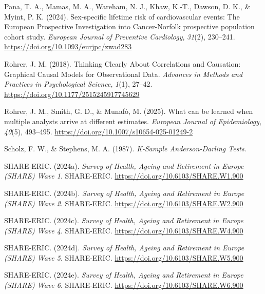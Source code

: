 \documentclass[
  man,
  floatsintext,
  longtable,
  nolmodern,
  notxfonts,
  notimes,
  colorlinks=true,linkcolor=blue,citecolor=blue,urlcolor=blue]{apa7}
\newlength{\cslhangindent}
\newenvironment{CSLReferences}[2] %
 {\begin{list}{}{%
  \setlength{\itemindent}{0pt}
  \setlength{\leftmargin}{0pt}
  \setlength{\parsep}{0pt}
  \ifodd #1
   \setlength{\leftmargin}{\cslhangindent}
   \setlength{\itemindent}{-1\cslhangindent}
  \fi
  \setlength{\itemsep}{#2\baselineskip}}}
 {\end{list}}
\begin{document}
\begin{CSLReferences}{1}{0}
Pana, T. A., Mamas, M. A., Wareham, N. J., Khaw, K.-T., Dawson, D. K.,
\& Myint, P. K. (2024). Sex-specific lifetime risk of cardiovascular
events: The {European} {Prospective} {Investigation} into
{Cancer}-{Norfolk} prospective population cohort study. \emph{European
Journal of Preventive Cardiology}, \emph{31}(2), 230--241.
\url{https://doi.org/10.1093/eurjpc/zwad283}

Rohrer, J. M. (2018). Thinking {Clearly} {About} {Correlations} and
{Causation}: {Graphical} {Causal} {Models} for {Observational} {Data}.
\emph{Advances in Methods and Practices in Psychological Science},
\emph{1}(1), 27--42. \url{https://doi.org/10.1177/2515245917745629}

Rohrer, J. M., Smith, G. D., \& Munafò, M. (2025). What can be learned
when multiple analysts arrive at different estimates. \emph{European
Journal of Epidemiology}, \emph{40}(5), 493--495.
\url{https://doi.org/10.1007/s10654-025-01249-2}

Scholz, F. W., \& Stephens, M. A. (1987). \emph{K-{Sample}
{Anderson}-{Darling} {Tests}}.

SHARE-ERIC. (2024a). \emph{Survey of {Health}, {Ageing} and {Retirement}
in {Europe} ({SHARE}) {Wave} 1}. SHARE-ERIC.
\url{https://doi.org/10.6103/SHARE.W1.900}

SHARE-ERIC. (2024b). \emph{Survey of {Health}, {Ageing} and {Retirement}
in {Europe} ({SHARE}) {Wave} 2}. SHARE-ERIC.
\url{https://doi.org/10.6103/SHARE.W2.900}

SHARE-ERIC. (2024c). \emph{Survey of {Health}, {Ageing} and {Retirement}
in {Europe} ({SHARE}) {Wave} 4}. SHARE-ERIC.
\url{https://doi.org/10.6103/SHARE.W4.900}

SHARE-ERIC. (2024d). \emph{Survey of {Health}, {Ageing} and {Retirement}
in {Europe} ({SHARE}) {Wave} 5}. SHARE-ERIC.
\url{https://doi.org/10.6103/SHARE.W5.900}

SHARE-ERIC. (2024e). \emph{Survey of {Health}, {Ageing} and {Retirement}
in {Europe} ({SHARE}) {Wave} 6}. SHARE-ERIC.
\url{https://doi.org/10.6103/SHARE.W6.900}


\end{CSLReferences}
\end{document}
